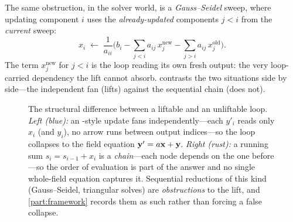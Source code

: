 The same obstruction, in the solver world, is a \emph{Gauss--Seidel} sweep, where
updating component $i$ uses the \emph{already-updated} components $j<i$ from the
\emph{current} sweep:
\begin{equation}
  x_i \;\leftarrow\; \frac{1}{a_{ii}}\Big(b_i - \sum_{j<i} a_{ij}\,x_j^{\text{new}}
       - \sum_{j>i} a_{ij}\,x_j^{\text{old}}\Big).
  \label{eq:t-gs}
\end{equation}
The term $x_j^{\text{new}}$ for $j<i$ is the loop reading its own fresh output:
the very loop-carried dependency the lift cannot absorb. 
contrasts the two situations side by side---the independent fan (lifts) against
the sequential chain (does not).

\begin{figure}[t]
\centering
{}
\caption[When the lift fails]{The structural difference between a liftable and an
unliftable loop. \emph{Left (blue):} an -style update fans
independently---each $y'_i$ reads only $x_i$ (and $y_i$), no arrow runs between
output indices---so the loop collapses to the field equation $\mathbf{y}'=a\mathbf{x}+\mathbf{y}$.
\emph{Right (rust):} a running sum $s_i=s_{i-1}+x_i$ is a \emph{chain}---each
node depends on the one before---so the order of evaluation is part of the answer
and no single whole-field equation captures it. Sequential reductions of this
kind (Gauss--Seidel, triangular solves) are \emph{obstructions} to the lift, and
\cref{part:framework} records them as such rather than forcing a false collapse.}
\label{fig:t-liftfail}
\end{figure}

